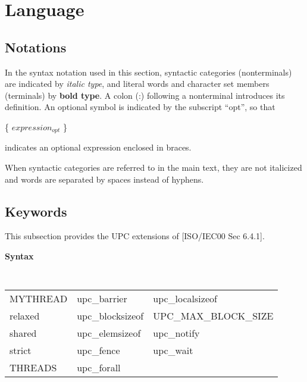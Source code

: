 \pagebreak
\section{Language}
\subsection{Notations} 

\npf In the syntax notation used in this section, syntactic
    categories (nonterminals) are indicated by {\em italic type}, and
    literal words and character set members (terminals) by {\bf bold
    type}. A colon (:) following a nonterminal introduces its
    definition.  An optional symbol is
    indicated by the subscript ``opt'', so that

\begin{center}
          \{ $expression_{opt}$ \}
\end{center}

    indicates an optional expression enclosed in braces. 

\np When syntactic categories are referred to in the main
    text, they are not italicized and words are separated by spaces
    instead of hyphens.
    
\subsection{Keywords}

\npf This subsection provides the UPC extensions of [ISO/IEC00 Sec 6.4.1].

{\bf Syntax}


\begin{center}
{\tt\bf 
\begin{tabular}{lll}
MYTHREAD & upc\_barrier & upc\_localsizeof  \\
relaxed & upc\_blocksizeof & UPC\_MAX\_BLOCK\_SIZE \\
shared &  upc\_elemsizeof & upc\_notify \\
strict &   upc\_fence  & upc\_wait \\
THREADS & upc\_forall  \\
\end{tabular}
}
\end{center}


